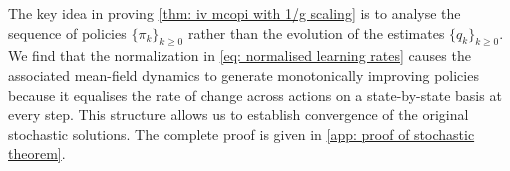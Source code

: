 \documentclass{article}
\begin{document}
The key idea in proving \autoref{thm: iv mcopi with 1/g scaling} is to analyse the sequence of policies $\{\pi_k\}_{k\ge 0}$ rather than the evolution of the estimates $\{q_k\}_{k\ge 0}$.
We find that the normalization in \eqref{eq: normalised learning rates}
causes the associated mean-field dynamics to generate monotonically improving policies
because it equalises the rate of change across actions on a state-by-state basis at every step.
This structure allows us to establish convergence of the original stochastic solutions. The complete proof is given in \autoref{app: proof of stochastic theorem}.



\end{document}
